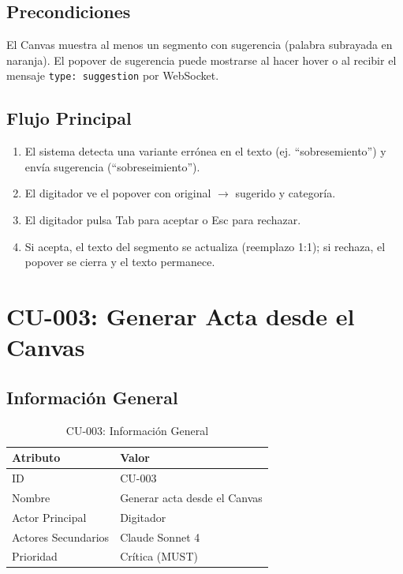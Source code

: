 \documentclass[12pt,a4paper]{report}
\begin{document}
\subsection{Precondiciones}

El Canvas muestra al menos un segmento con sugerencia (palabra subrayada en naranja). El popover de sugerencia puede mostrarse al hacer hover o al recibir el mensaje \texttt{type: suggestion} por WebSocket.

\subsection{Flujo Principal}

\begin{enumerate}
    \item El sistema detecta una variante errónea en el texto (ej. ``sobresemiento'') y envía sugerencia (``sobreseimiento'').
    \item El digitador ve el popover con original $\to$ sugerido y categoría.
    \item El digitador pulsa Tab para aceptar o Esc para rechazar.
    \item Si acepta, el texto del segmento se actualiza (reemplazo 1:1); si rechaza, el popover se cierra y el texto permanece.
\end{enumerate}

\section{CU-003: Generar Acta desde el Canvas}

\subsection{Información General}

\begin{table}[H]
\centering
\small
\begin{tabular}{|p{3.5cm}|p{9.5cm}|}
\hline
\rowcolor{primaryblue!20}
\textbf{Atributo} & \textbf{Valor} \\
\hline
ID & CU-003 \\
\hline
Nombre & Generar acta desde el Canvas \\
\hline
Actor Principal & Digitador \\
\hline
Actores Secundarios & Claude Sonnet 4 \\
\hline
Prioridad & Crítica (MUST) \\
\hline
\end{tabular}
\caption{CU-003: Información General}
\end{table}
\end{document}
